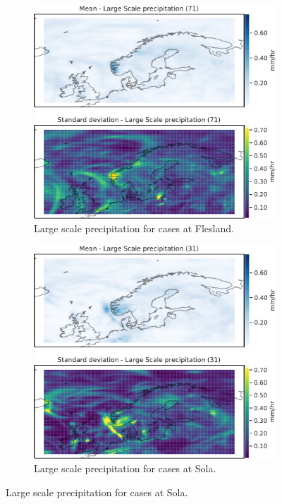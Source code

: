 \begin{figure}[H]
     \centering
     \begin{subfigure}[b]{0.49\textwidth}
         \centering
         \includegraphics[width=\textwidth]{Figures/lsPENBR.pdf}
         \caption{Large scale precipitation for cases at  Flesland.}
         \label{fig:ENBRlsP}
     \end{subfigure}
     \hfill
     \begin{subfigure}[b]{0.49\textwidth}
         \centering
         \includegraphics[width=\textwidth]{Figures/lsPENZV.pdf}
         \caption{Large scale precipitation for cases at Sola.}
         \label{fig:ENZVlsP}
     \end{subfigure}


\end{figure}
